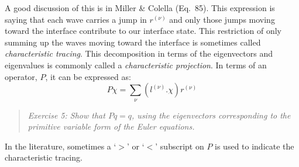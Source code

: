 \documentclass[11pt]{article}
\begin{document}
A good discussion of this is in Miller \& Colella
\cite{millercolella:2002} (Eq.\ 85).  This expression is saying that
each wave carries a jump in $r^{(\nu)}$ and only those jumps moving
toward the interface contribute to our interface state.  This
restriction of only summing up the waves moving toward the interface
is sometimes called {\em characteristic tracing}.  This decomposition
in terms of the eigenvectors and eigenvalues is commonly called a {\em
  characteristic projection}.  In terms of an operator, $P$, it can be
expressed as:
\begin{equation}
P \chi = \sum_\nu (l^{(\nu)} . \chi) r^{(\nu)}
\end{equation}
\begin{quote}
{\em Exercise 5: 
Show that $P q = q$, using the eigenvectors corresponding to the primitive
 variable form of the Euler equations.}
\end{quote}
In the literature, sometimes a `$>$' or `$<$' subscript on $P$ is used
to indicate the characteristic tracing.
\end{document}
